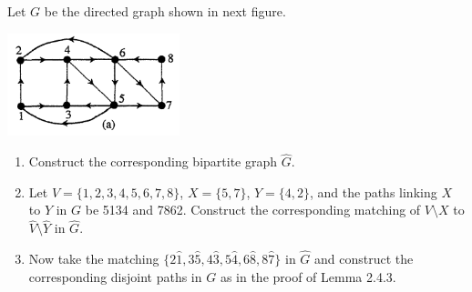 \prob
{
    Let $G$ be the directed graph shown in next figure.
            \begin{center}
                \includegraphics[width=5cm]{Test2/Problem12/DirectedGraphs.png}
            \end{center}\pn
    
    \begin{enumerate}[label=(\roman*)]
        \item   Construct the corresponding bipartite graph $\hat{G}$.
        \item   Let $V = \{1,2,3,4,5,6,7,8\}$, $X=\{5,7\}$, $Y=\{4,2\}$,
                and the paths linking $X$ to $Y$ in $G$ be 5134 and 7862. Construct the
                corresponding matching of $V \setminus X$ to $\hat{V} \setminus \hat{Y}$ in $\hat{G}$.
        \item   Now take the matching $\{2\hat{1}, 3\hat{5}, 4\hat{3}, 5\hat{4}, 6\hat{8}, 8\hat{7}\}$ in $\hat{G}$ and 
                construct the corresponding disjoint paths in $G$ as in the proof of Lemma 2.4.3.
    \end{enumerate}
}
